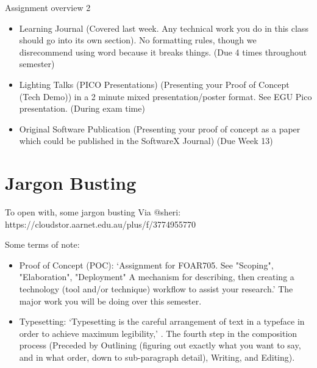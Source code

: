 \documentclass[aspectratio=1610, 11pt]{beamer} %
\begin{document}
\begin{frame}{Assignment overview 2}
\begin{itemize}[label=\textbullet]

\item Learning Journal (Covered last week. Any technical work you do in this class should go into its own section). No formatting rules, though we disrecommend using word because it breaks things. (Due 4 times throughout semester)
\item Lighting Talks (PICO Presentations) (Presenting your Proof of Concept (Tech Demo)) in a 2 minute mixed presentation/poster format. See EGU Pico presentation. (During exam time)
\item Original Software Publication (Presenting your proof of concept as a paper which could be published in the SoftwareX Journal) (Due Week 13)
\end{itemize}

\end{frame}

\section{Jargon Busting}
\begin{frame}{To open with, some jargon busting}
Via @sheri: https://cloudstor.aarnet.edu.au/plus/f/3774955770

Some terms of note:

\begin{itemize}[label=\textbullet]
    \item Proof of Concept (POC): `Assignment for FOAR705. See "Scoping", "Elaboration", "Deployment" A mechanism for describing, then creating a technology (tool and/or technique) workflow to assist your research.' The major work you will be doing over this semester. 
    \item Typesetting: `Typesetting is the careful arrangement of text in a typeface in order to achieve maximum legibility,' \cite{Newcomb2019-hm}. The fourth step in the composition process (Preceded by Outlining (figuring out exactly what you want to say, and in what order, down to sub-paragraph detail), Writing, and Editing).
\end{itemize}


\end{frame}
\end{document}
